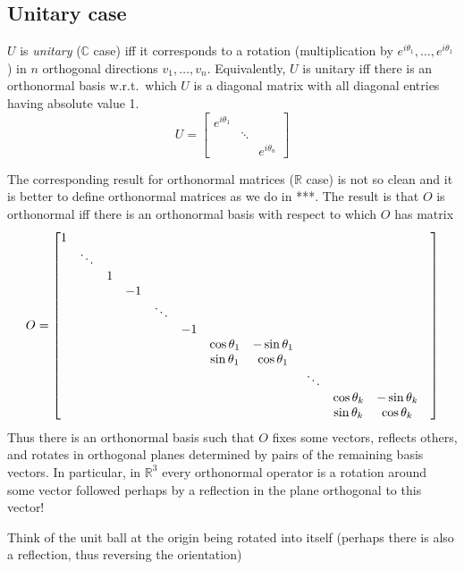 \documentclass[a4paper]{amsart}
\theoremstyle{plain}
\theoremstyle{definition}
\theoremstyle{remark}
\begin{document}
\subsection{Unitary case}
$ U $  is \emph{unitary} ($ \mathbb{C} $  case) iff it corresponds to a rotation (multiplication by 
$ e^{i\theta_1}, \dots, e^{i\theta_1} $) in $ n $  orthogonal directions $ v_1,\dots, v_n $.
Equivalently, $ U $  is unitary iff there is an orthonormal basis w.r.t.\ which $ U $  
is a diagonal matrix with all diagonal entries having absolute value 1. 
\[
U = 
   \begin{bmatrix} %
      e^{i\theta_1}  & & \\
       & \ddots & \\
       & & e^{i\theta_n} 
   \end{bmatrix}
   \]

The corresponding result for orthonormal matrices ($ \mathbb{R} $  case) is not so clean 
and it is better to define orthonormal matrices as we do in ***. The result 
is that $ O $  is orthonormal iff there is an orthonormal basis with respect to 
which $ O $ has matrix 
\[
\setcounter{MaxMatrixCols}{12} 
O = 
   \begin{bmatrix}  %
      1 & & & & & & & && &&  \\
       & \ddots &&&&&&&&&& \\
       & & 1 &&&&&&&&& \\
       &&& -1 &&&&&&& \\
       &&&& \ddots &&&&&&\\
       &&&& &-1 &&&&&&\\
       &&&&&& \cos \theta_1 & - \sin\theta_1 &&&&\\
       &&&&&& \sin\theta_1 & \cos \theta_1 &&&&\\
       &&&&&&&& \ddots &&&\\
       &&&&&&&&& \cos \theta_k & - \sin\theta_k&\\
       &&&&&&&&& \sin\theta_k & \cos \theta_k
   \end{bmatrix}
   \]
Thus there is an orthonormal basis such that $ O $ fixes some vectors, reflects 
others, and rotates in orthogonal planes determined by pairs of the 
remaining basis vectors. In particular, in $ \mathbb{R}^3 $  every orthonormal operator 
is a rotation around some vector followed perhaps by a reflection in the 
plane orthogonal to this vector! 

Think of the unit ball at the origin being rotated into itself (perhaps there 
is also a reflection, thus reversing the orientation)
\end{document}
